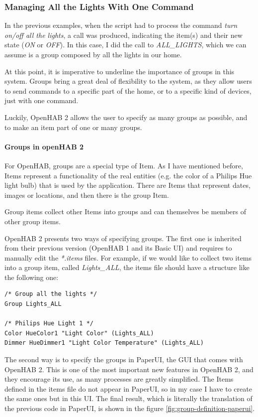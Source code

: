 \subsubsection{Managing All the Lights With One Command}
In the previous examples, when the script had to process the command \textit{turn on/off all the lights}, a call was produced, indicating
the item(s) and their new state (\textit{ON} or \textit{OFF}). In this case, I did the call to \textit{ALL\_LIGHTS}, which we can
assume is a group composed by all the lights in our home.

At this point, it is imperative to underline the importance of groups in this system. Groups bring a great deal of flexibility to the system,
as they allow users to send commands to a specific part of the home, or to a specific kind of devices, just with one command.

Luckily, OpenHAB 2 allows the user to specify as many groups as possible, and to make an item part of one or many groups.

\paragraph{Groups in openHAB 2}
For OpenHAB, groups are a special type of Item. As I have mentioned before, Items represent a functionality of the real entities
(e.g. the color of a Philips Hue light bulb) that is used by the application. There are Items that represent dates, images or locations,
and then there is the group Item.

Group items collect other Items into groups and can themselves be members of other group items.

OpenHAB 2 presents two ways of specifying groups. The first one is inherited from their previous version (OpenHAB 1 and its Basic
UI) and requires to manually edit the \textit{*.items} files. For example, if we would like to collect two items into a group item,
called \textit{Lights\_ALL}, the items file should have a structure like the following one:

\begin{lstlisting}[style=Consola]
/* Group all the lights */
Group Lights_ALL

/* Philips Hue Light 1 */
Color HueColor1 "Light Color" (Lights_ALL)
Dimmer HueDimmer1 "Light Color Temperature" (Lights_ALL)
\end{lstlisting}

The second way is to specify the groups in PaperUI, the GUI that comes with OpenHAB 2. This is one of the most important new features
in OpenHAB 2, and they encourage its use, as many processes are greatly simplified. The Items defined in the items file do not
appear in PaperUI, so in my case I have to create the same ones but in this UI. The final result, which is literally the translation
of the previous code in PaperUI, is shown in the figure \ref{fig:group-definition-paperui}.

